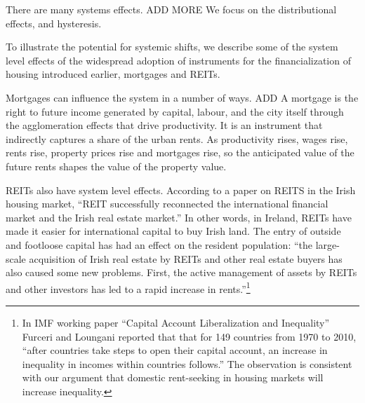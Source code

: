 There are many systems effects. ADD MORE %
We focus on the distributional effects, and hysteresis.

To illustrate the potential for systemic shifts, we describe some of the system level effects of the widespread adoption of instruments for the financialization of housing introduced earlier, mortgages and REITs. 

Mortgages can influence the system in a number of ways. ADD %
A mortgage is the right to future income generated by capital, labour, and the city itself through the agglomeration effects that drive productivity. It is an instrument that indirectly captures a share of the urban rents. As productivity rises, wages rise, rents rise, property prices rise and mortgages rise, so the anticipated value of the future rents shapes the value of the property value. %

REITs also have system level effects. %
According to a paper \cite{wangAnalyzeImpactREITs2021} on REITS in the Irish housing market, ``REIT successfully reconnected the international financial market and the Irish real estate market.'' In other words, in Ireland, REITs have made it easier for international capital to buy Irish land. The entry of outside and footloose capital has had an effect on the resident population:  ``the large-scale acquisition of Irish real estate by REITs and other real estate buyers has also caused some new problems. First, the active management of assets by REITs and other investors has led to a rapid increase in rents.''\footnote{In  IMF working paper ``Capital Account Liberalization and Inequality'' \cite{furceriCapitalAccountLiberalization2015}  Furceri and Loungani reported that that for 149 countries from 1970 to 2010, ``after countries take steps to open their capital account, an increase in inequality in incomes within countries follows.'' The observation is consistent with our argument  that domestic \gls{rent-seeking} in housing markets will increase inequality.}  


